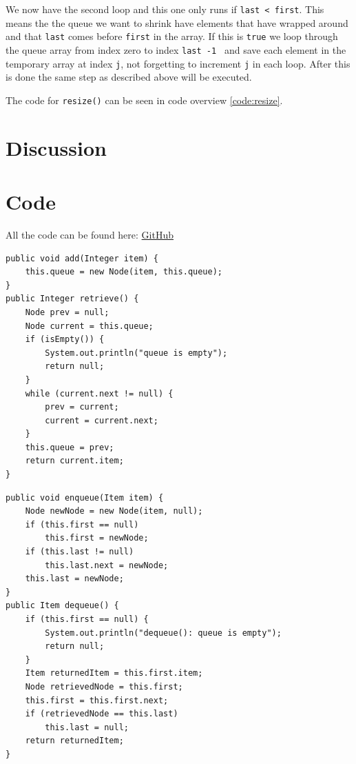\documentclass[a4paper,11pt]{article}
\newenvironment{code}{\captionsetup{type=listing}}{}
\begin{document}
We now have the second loop and this one only runs if {\tt last < first}. This means the the queue we want to shrink
have elements that have wrapped around and that {\tt last} comes before {\tt first} in the array. If this is {\tt true}
we loop through the queue array from index zero to index {\tt last -1 } and save each element in the temporary array at
index {\tt j}, not forgetting to increment {\tt j} in each loop. After this is done the same step as described above will
be executed.

The code for {\tt resize()} can be seen in code overview \ref{code:resize}.

\section{Discussion}


\newpage
\FloatBarrier
\section*{Code}
All the code can be found here: \href{https://github.com/adrian-jonsson-sjoedin/ID1021-AlgoData/tree/main/Tasks/Queues/src}{GitHub}

\begin{code}
    \label{code:queueNoLast}
    \begin{verbatim}
public void add(Integer item) {
    this.queue = new Node(item, this.queue);
}
public Integer retrieve() {
    Node prev = null;
    Node current = this.queue;
    if (isEmpty()) {
        System.out.println("queue is empty");
        return null;
    }
    while (current.next != null) {
        prev = current;
        current = current.next;
    }
    this.queue = prev;
    return current.item;
}
\end{verbatim}
\end{code}

\begin{code}
    \label{code:queue}
    \begin{verbatim}
public void enqueue(Item item) {
    Node newNode = new Node(item, null);
    if (this.first == null)
        this.first = newNode;
    if (this.last != null)
        this.last.next = newNode;
    this.last = newNode;
}
public Item dequeue() {
    if (this.first == null) {
        System.out.println("dequeue(): queue is empty");
        return null;
    }
    Item returnedItem = this.first.item;
    Node retrievedNode = this.first;
    this.first = this.first.next;
    if (retrievedNode == this.last)
        this.last = null;
    return returnedItem;
}
\end{verbatim}
\end{code}
\end{document}
